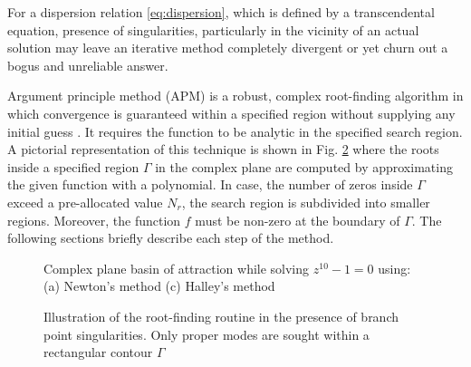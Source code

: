 For a dispersion relation \eqref{eq:dispersion}, which is defined by a transcendental equation, presence of singularities, particularly in the vicinity of an actual solution may leave an iterative method completely divergent or yet churn out a bogus and unreliable answer.

Argument principle method (APM) is a robust, complex root-finding algorithm in which convergence is guaranteed within a specified region without supplying any initial guess \cite{Delves1967c,Carpentier1982c,Botten1983,Kravanja2000c,Dellnitz2002c,Gillan2006c,Chen2017}. It requires the function to be analytic in the specified search region. A pictorial representation of this technique is shown in Fig. \ref{fig:zplane} where the roots inside a specified region $\Gamma$ in the complex plane are computed by approximating the given function with a polynomial. In case, the number of zeros inside $\Gamma$ exceed a pre-allocated value $N_r$, the search region is subdivided into smaller regions. Moreover, the function $f$ must be non-zero at the boundary of $\Gamma$. The following sections briefly describe each step of the method.
%
\begin{figure}[t!]
  \centering
   \hfil
  \caption{Complex plane basin of attraction while solving $z^{10} - 1 =0$ using: (a) Newton's method (c) Halley's method}
  \label{fig:basins}
\end{figure}
%
\begin{figure}[t!]
  \centering
  \def\svgwidth{.5\linewidth}
  
  \caption{Illustration of the root-finding routine in the presence of branch point singularities. Only proper modes are sought within a rectangular contour $\Gamma$}
  \label{fig:zplane}
\end{figure}
